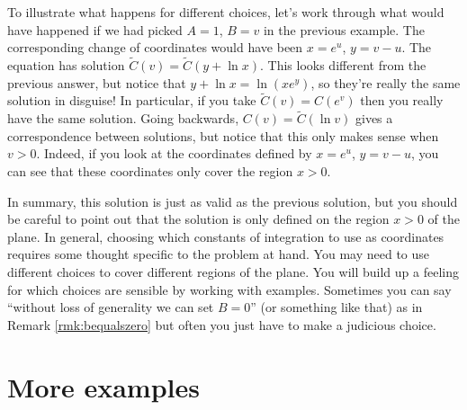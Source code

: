 \begin{exm}
To illustrate what happens for different choices, let's work through what would have happened if we had picked $A=1$, $B=v$ in the previous example. The corresponding change of coordinates would have been $x=e^u$, $y=v-u$. The equation has solution $\tilde{C}(v)=\tilde{C}(y+\ln x)$. This looks different from the previous answer, but notice that $y+\ln x=\ln(xe^y)$, so they're really the same solution in disguise! In particular, if you take $\tilde{C}(v)=C(e^v)$ then you really have the same solution. Going backwards, $C(v)=\tilde{C}(\ln v)$ gives a correspondence between solutions, but notice that this only makes sense when $v>0$. Indeed, if you look at the coordinates defined by $x=e^u$, $y=v-u$, you can see that these coordinates only cover the region $x>0$.
\end{exm}

\begin{rmk}
In summary, this solution is just as valid as the previous solution, but you should be careful to point out that the solution is only defined on the region $x>0$ of the plane. In general, choosing which constants of integration to use as coordinates requires some thought specific to the problem at hand. You may need to use different choices to cover different regions of the plane. You will build up a feeling for which choices are sensible by working with examples. Sometimes you can say ``without loss of generality we can set $B=0$'' (or something like that) as in Remark \ref{rmk:bequalszero} but often you just have to make a judicious choice.
\end{rmk}

\section{More examples}

